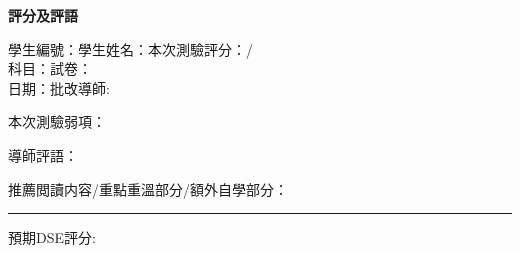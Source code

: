 \documentclass[12pt]{article}
\begin{document}
    \pagestyle{empty}
    \begin{center}
        \textbf{評分及評語}
    \end{center}

    \noindent 學生編號：\hrulefill 學生姓名：\hrulefill \hfill 本次測驗評分：\hrulefill/\hrulefill\\
    科目：\hrulefill\hfill 試卷：\hrulefill\\
    日期：\hrulefill\hfill 批改導師:\hrulefill

    \noindent 本次測驗弱項：
    \vspace{6cm}

    \noindent 導師評語：

    \hrulefill

    \hrulefill

    \hrulefill

    \hrulefill

    \hrulefill

    \hrulefill

    \hrulefill

    \hrulefill

    \hrulefill

    \noindent 推薦閲讀内容/重點重溫部分/額外自學部分：
    \vspace{6cm}
    
    \hrule

    \noindent 預期DSE評分:
\end{document}
